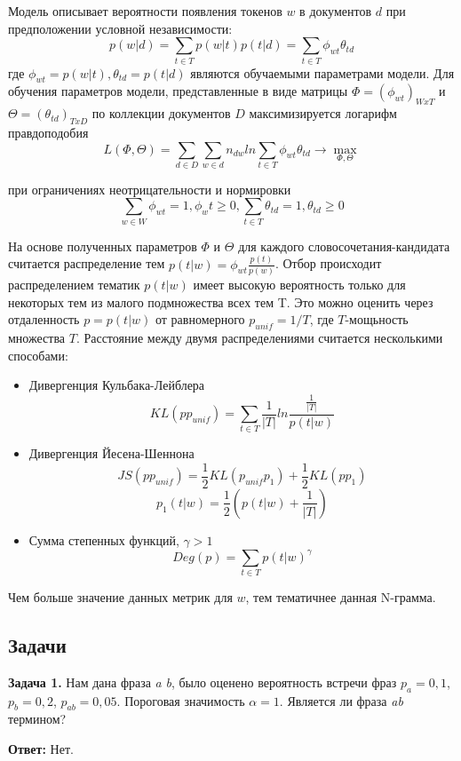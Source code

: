 Модель описывает вероятности появления токенов $w$ в документов $d$ при предположении условной независимости:
$$p(w|d) = \sum_{t \in T} p(w|t)p(t|d) = \sum_{t \in T} \phi_{wt} \theta_{td}$$
где $\phi_{wt} = p(w|t), \theta_{td} = p(t|d)$ являются обучаемыми параметрами модели. Для обучения параметров модели, представленные в виде матрицы $\Phi = (\phi_{wt})_{WxT}$ и $\Theta = (\theta_{td})_{TxD}$ по коллекции документов $D$ максимизируется логарифм правдоподобия
$$L(\Phi, \Theta) = \sum_{d \in D} \sum_{w \in d} n_{dw} ln \sum_{t \in T} \phi_{wt} \theta_{td} \rightarrow \max_{\Phi, \Theta}$$

при ограничениях неотрицательности и нормировки
$$\sum_{w \in W} \phi_{wt} = 1, \phi_wt \geq 0, \sum_{t \in T} \theta_{td} = 1, \theta_{td} \geq 0$$

На основе полученных параметров $\Phi$ и $\Theta$ для каждого словосочетания-кандидата считается распределение тем $p(t|w) = \phi_{wt} \frac{p(t)}{p(w)}$. Отбор происходит распределением тематик $p(t|w)$ имеет высокую вероятность только для некоторых тем из малого подмножества всех тем T. Это можно оценить через отдаленность $p = p(t|w)$ от равномерного $p_{unif} = 1/T$, где $T$-мощьность множества $T$. Расстояние между двумя распределениями считается несколькими способами:

\begin{itemize}
	\item Дивергенция Кульбака-Лейблера
	$$KL(pp_{unif}) = \sum_{t \in T} \frac{1}{|T|} ln \frac{\frac{1}{|T|}}{p(t|w)}$$
	\item Дивергенция Йесена-Шеннона
	$$JS(pp_{unif}) = \frac{1}{2}KL(p_{unif}p_{1}) + \frac{1}{2}KL(pp_{1})$$
	$$p_{1}(t|w) = \frac{1}{2}(p(t|w) + \frac{1}{|T|})$$
	\item Сумма степенных функций, $\gamma > 1$
	$$Deg(p) = \sum_{t \in T} p(t|w)^{\gamma}$$
\end{itemize}

Чем больше значение данных метрик для $w$, тем тематичнее данная N-грамма.

\subsection*{Задачи}

\textbf{Задача 1.} Нам дана фраза \textit{a} \textit{b}, было оценено вероятность встречи фраз $p_{a} = 0,1$, $p_{b} = 0,2$, $p_{ab} = 0,05$. Пороговая значимость $\alpha = 1$. Является ли фраза \textit{ab} термином?

\textbf{Ответ:} Нет.


